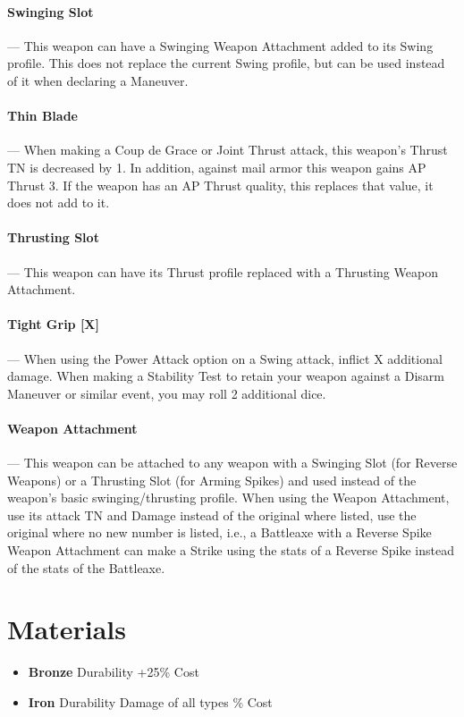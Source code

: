 \documentclass[oneside,11pt,english]{book}
\begin{document}
\paragraph{\label{wepqual:Swinging Slot}Swinging Slot}---\quad
This weapon can have a Swinging Weapon Attachment added to its Swing profile. This does not replace the current Swing profile, but can be used instead of it when declaring a Maneuver.

\paragraph{\label{wepqual:Thin Blade}Thin Blade}---\quad
When making a Coup de Grace or Joint Thrust attack, this weapon’s Thrust TN is decreased by 1. In addition, against mail armor this weapon gains AP Thrust 3. If the weapon has an AP Thrust quality, this replaces that value, it does not add to it.

\paragraph{\label{wepqual:Thrusting Slot}Thrusting Slot}---\quad
This weapon can have its Thrust profile replaced with a Thrusting Weapon Attachment.

\paragraph{\label{wepqual:Tight Grip}Tight Grip [X]}---\quad
When using the Power Attack option on a Swing attack, inflict X additional damage. When making a Stability Test to retain your weapon against a Disarm Maneuver or similar event, you may roll 2 additional dice.

\paragraph{\label{wepqual:Weapon Attachment}Weapon Attachment}---\quad
This weapon can be attached to any weapon with a Swinging Slot (for Reverse Weapons) or a Thrusting Slot (for Arming Spikes) and used instead of the weapon’s basic swinging/thrusting profile. When using the Weapon Attachment, use its attack TN and Damage instead of the original where listed, use the original where no new number is listed, i.e., a Battleaxe with a Reverse Spike Weapon Attachment can make a Strike using the stats of a Reverse Spike instead of the stats of the Battleaxe.

\section{Materials}
\begin{itemize}
	\item [] \textbf{Bronze}
	 Durability
	\subitem +25\% Cost
\end{itemize}
\begin{itemize}
\item [] \textbf{Iron}
 Durability
 Damage of all types
\% Cost
\end{itemize}
\end{document}
